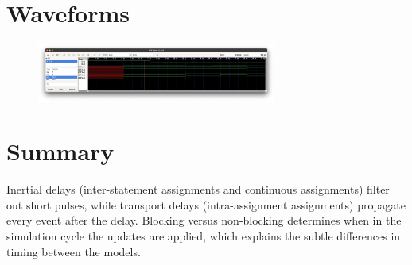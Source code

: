 \documentclass[11pt]{article}
\begin{document}
\section*{Waveforms}

        \begin{figure}[h!]
            \centering 
            \includegraphics[width=0.7\textwidth]{B_delay.png}
        \end{figure}


\section*{Summary}
Inertial delays (inter-statement assignments and continuous assignments) filter out short pulses, while transport delays (intra-assignment assignments) propagate every event after the delay. Blocking versus non-blocking determines when in the simulation cycle the updates are applied, which explains the subtle differences in timing between the models.
\end{document}
